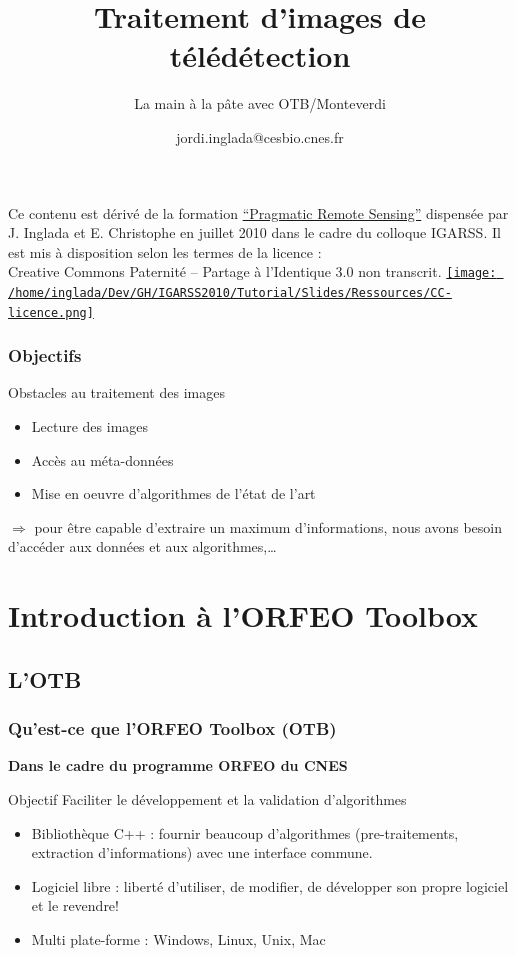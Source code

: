 \documentclass[compress]{beamer}
\title{Traitement d'images de télédétection}
\subtitle{La main à la pâte avec OTB/Monteverdi} %
\author
{jordi.inglada@cesbio.cnes.fr}
\institute[Cesbio] %
{\textsc{Centre d'Études Spatiales de la Biosphère, Toulouse, France}}
\date{}
\begin{document}
\begin{frame}
  \titlepage
  \begin{center}
{\tiny Ce contenu est dérivé de la formation \href{http://www.orfeo-toolbox.org/packages/PragmaticRemoteSensing-handout.pdf}{``Pragmatic Remote
  Sensing''} dispensée par J. Inglada et E. Christophe en juillet 2010
  dans le cadre du colloque IGARSS. Il est mis à disposition selon les termes de la licence :\\
Creative Commons Paternité – Partage à l’Identique 3.0 non transcrit.} \href{http://creativecommons.org/licenses/by-sa/3.0/}{\texttt{[image: /home/inglada/Dev/GH/IGARSS2010/Tutorial/Slides/Ressources/CC-licence.png]}}    
  \end{center}

\end{frame}

\begin{frame}
\frametitle{Objectifs}
\begin{block}{Obstacles au traitement des images}
\begin{itemize}
 \item Lecture des images
 \item Accès au méta-données
 \item Mise en oeuvre d'algorithmes de l'état de l'art
\end{itemize}
\end{block}
$\Rightarrow$ pour être capable \alert{d'extraire un maximum
  d'informations}, nous avons besoin \alert{d'accéder} aux données et
aux algorithmes,\ldots
\end{frame}


\section{Introduction à l'ORFEO Toolbox}



\subsection{L'OTB}
\begin{frame}
\frametitle{Qu'est-ce que l'ORFEO Toolbox (OTB)}

\textbf{Dans le cadre du programme ORFEO du CNES}
\begin{alertblock}{Objectif}
Faciliter le développement et la validation d'algorithmes
\end{alertblock}
\begin{block}{}
\begin{itemize}
 \item Bibliothèque C++ : fournir beaucoup d'algorithmes
   (pre-traitements, extraction d'informations) avec une interface commune.
 \item Logiciel libre : liberté d'utiliser, de modifier, de développer
   son propre logiciel et le revendre!
 \item Multi plate-forme : Windows, Linux, Unix, Mac
\end{itemize}
\end{block}
\end{frame}
\end{document}
